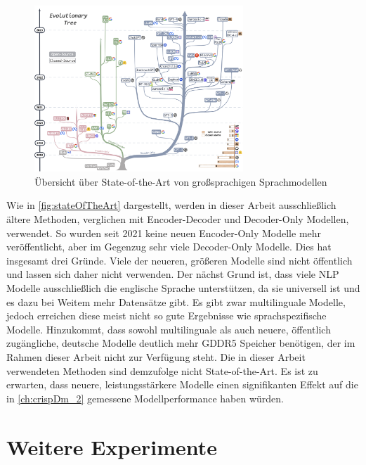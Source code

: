
\begin{figure}[H]
  \centering
  \includegraphics[width=0.7\textwidth]{data/images/tree.png}
  \caption{Übersicht über State-of-the-Art von großsprachigen Sprachmodellen \autocite{yang_harnessing_2023}} \label{fig:stateOfTheArt}
\end{figure}

Wie in \autoref{fig:stateOfTheArt} dargestellt, werden in dieser Arbeit ausschließlich ältere Methoden, verglichen mit Encoder-Decoder und Decoder-Only Modellen, verwendet. So wurden seit \num{2021} keine neuen Encoder-Only Modelle mehr veröffentlicht, aber im Gegenzug sehr viele Decoder-Only Modelle. Dies hat insgesamt drei Gründe. Viele der neueren, größeren Modelle sind nicht öffentlich und lassen sich daher nicht verwenden. Der nächst Grund ist, dass viele \ac{NLP} Modelle ausschließlich die englische Sprache unterstützen, da sie universell ist und es dazu bei Weitem mehr Datensätze gibt. Es gibt zwar multilinguale Modelle, jedoch erreichen diese meist nicht so gute Ergebnisse wie sprachspezifische Modelle. Hinzukommt, dass sowohl multilinguale als auch neuere, öffentlich zugängliche, deutsche Modelle deutlich mehr \ac{GDDR5} Speicher benötigen, der im Rahmen dieser Arbeit nicht zur Verfügung steht. Die in dieser Arbeit verwendeten Methoden sind demzufolge nicht State-of-the-Art. Es ist zu erwarten, dass neuere, leistungsstärkere Modelle einen signifikanten Effekt auf die in \autoref{ch:crispDm_2} gemessene Modellperformance haben würden.

\section{Weitere Experimente} \label{subsec:furtherExperiments}

